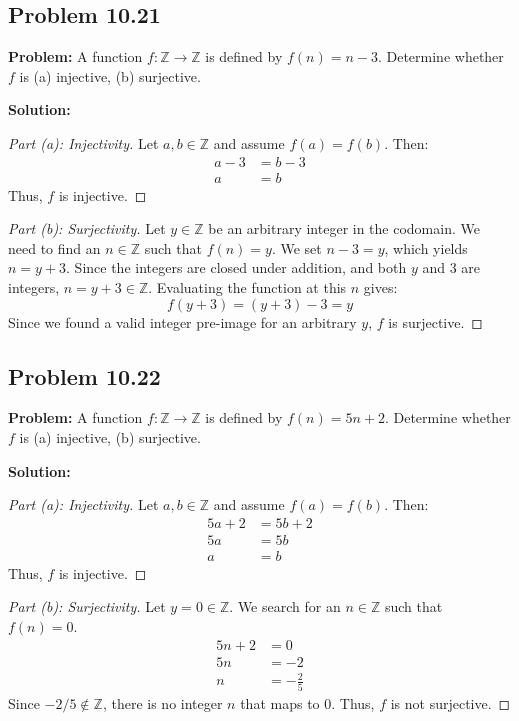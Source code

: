 \documentclass[11pt, a4paper]{article}
\theoremstyle{definition}
\theoremstyle{remark}
\newcommand{\Z}{\mathbb{Z}}
\begin{document}
\subsection{Problem 10.21}
\textbf{Problem:} A function $f : \Z \to \Z$ is defined by $f(n) = n - 3$. Determine whether $f$ is (a) injective, (b) surjective.

\textbf{Solution:}
\begin{proof}[Part (a): Injectivity]
Let $a, b \in \Z$ and assume $f(a) = f(b)$. Then:
\begin{align*}
a - 3 &= b - 3 \\
a &= b
\end{align*}
Thus, $f$ is injective.
\end{proof}
\begin{proof}[Part (b): Surjectivity]
Let $y \in \Z$ be an arbitrary integer in the codomain. We need to find an $n \in \Z$ such that $f(n) = y$. We set $n - 3 = y$, which yields $n = y + 3$. Since the integers are closed under addition, and both $y$ and $3$ are integers, $n = y + 3 \in \Z$. Evaluating the function at this $n$ gives:
\[ f(y + 3) = (y + 3) - 3 = y \]
Since we found a valid integer pre-image for an arbitrary $y$, $f$ is surjective.
\end{proof}

\subsection{Problem 10.22}
\textbf{Problem:} A function $f : \Z \to \Z$ is defined by $f(n) = 5n + 2$. Determine whether $f$ is (a) injective, (b) surjective.

\textbf{Solution:}
\begin{proof}[Part (a): Injectivity]
Let $a, b \in \Z$ and assume $f(a) = f(b)$. Then:
\begin{align*}
5a + 2 &= 5b + 2 \\
5a &= 5b \\
a &= b
\end{align*}
Thus, $f$ is injective.
\end{proof}
\begin{proof}[Part (b): Surjectivity]
Let $y = 0 \in \Z$. We search for an $n \in \Z$ such that $f(n) = 0$.
\begin{align*}
5n + 2 &= 0 \\
5n &= -2 \\
n &= -\frac{2}{5}
\end{align*}
Since $-2/5 \notin \Z$, there is no integer $n$ that maps to $0$. Thus, $f$ is not surjective.
\end{proof}
\end{document}
